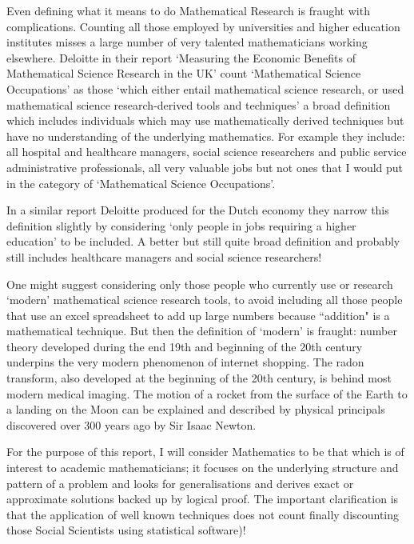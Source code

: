 \documentclass[11pt]{article} %
\begin{document}
	Even defining what it means to do Mathematical Research is fraught with complications. Counting all those employed by universities and higher education institutes misses a large number of very talented mathematicians working elsewhere. 	Deloitte in their report `Measuring the Economic Benefits of Mathematical Science Research in the UK' \cite{deloitteuk} count `Mathematical Science Occupations' as those `which either entail mathematical science research, or used mathematical science research-derived tools and techniques' a broad definition which includes individuals which may use mathematically derived techniques but have no understanding of the underlying mathematics. For example they include: all hospital and healthcare managers, social science researchers and public service administrative professionals, all very valuable jobs but not ones that I would put in the category of `Mathematical Science Occupations'. 
	
	
	In a similar report Deloitte produced for the Dutch economy \cite{deloitteNL} they narrow this definition slightly by considering `only people in jobs requiring a higher education' to be included.  A better but still quite broad definition and probably still includes healthcare managers and social science researchers!
	
	
	One might suggest considering only those people who currently use or research `modern' mathematical science research tools, to avoid including all those people that use an excel spreadsheet to add up large numbers because ``addition" is a mathematical technique. But then the definition of `modern' is fraught: number theory developed during the end 19th and beginning of the 20th century underpins the very modern phenomenon of internet shopping. The radon transform, also developed at the beginning of the 20th century, is behind most modern medical imaging. The motion of a rocket from the surface of the Earth to a landing on the Moon can be explained and described by physical principals discovered over 300 years ago by Sir Isaac Newton.
	
	
	For the purpose of this report, I  will consider Mathematics to be that which is of interest to academic mathematicians; it focuses  on the underlying structure and pattern of a problem and  looks for generalisations and derives exact or approximate solutions backed up by logical proof. The important clarification is that the application of well known techniques does not count finally discounting those Social Scientists using statistical software)!
	
\end{document}

